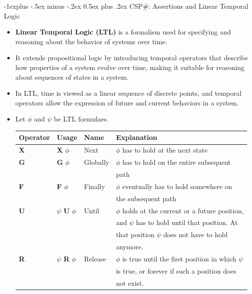 \documentclass[10pt, landscape]{article}
\makeatletter
\renewcommand{\subsection}{\@startsection{subsection}{2}{0mm}%
  {-1explus -.5ex minus -.2ex}%
  {0.5ex plus .2ex}%
{\normalfont\normalsize\bfseries}}
\makeatother
\begin{document}
\begin{multicols*}{3}
  \subsection{CSP\#: Assertions and Linear Temporal Logic}
  \begin{itemize}
    \item \textbf{Linear Temporal Logic (LTL)} is a formalism used for specifying and reasoning about the behavior of systems over time. 
    \item It extends propositional logic by introducing temporal operators that describe how properties of a system evolve over time, making it suitable for reasoning about sequences of states in a system. 
    \item In LTL, time is viewed as a linear sequence of discrete points, and temporal operators allow the expression of future and current behaviors in a system.
    \item Let $\phi$ and $\psi$ be LTL formulaes.
    \begin{center}
      \begin{tabular}{|l|l|l|l|}
        \hline
        \textbf{Operator} & \textbf{Usage} & \textbf{Name} & \textbf{Explanation} \\
        \hline
        \textbf{X} & \textbf{X} $\phi$ & Next & $\phi$ has to hold at the next state\\
        \hline
        \textbf{G} & \textbf{G} $\phi$ & Globally & $\phi$ has to hold on the entire subsequent \\ & & & path \\
        \hline
        \textbf{F} & \textbf{F} $\phi$ & Finally & $\phi$ eventually has to hold somewhere on \\ & & & the subsequent path\\ 
        \hline
        \textbf{U} & $\psi$ \textbf{U} $\phi$ & Until & $\phi$ holds at the current or a future position, \\ & & & and $\psi$ has to hold until that position. At \\ & & &  that position $\psi$ does not have to hold \\ & & & anymore.\\
        \hline
        \textbf{R} & $\psi$ \textbf{R} $\phi$ & Release & $\phi$ is true until the first position in which $\psi$ \\ & & & is true, or forever if such a position does \\ & & & not exist.\\
        \hline
      \end{tabular}

\end{center}
\end{itemize}
\end{multicols*}
\end{document}
